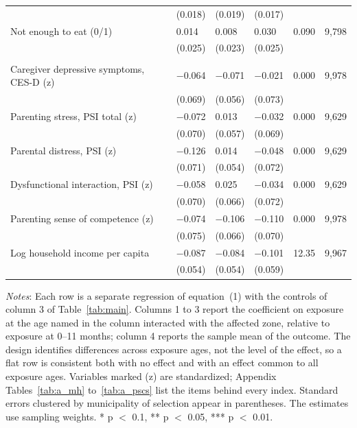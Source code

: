 \begin{table}[htbp]
\begin{minipage}{460pt}
{\begin{tabular*}{460pt}{@{}p{200pt}@{\extracolsep{\fill}}lllll@{}}
 & (0.018) & (0.019) & (0.017) & & \\
Not enough to eat (0/1) & 0.014 & 0.008 & 0.030 & 0.090 & 9,798 \\
 & (0.025) & (0.023) & (0.025) & & \\
\addlinespace[5pt]
\multicolumn{6}{@{}l}{\textbf{\textit{Panel C: Caregiver and household}}} \\
Caregiver depressive symptoms, CES-D (z) & $-$0.064 & $-$0.071 & $-$0.021 & 0.000 & 9,978 \\
 & (0.069) & (0.056) & (0.073) & & \\
Parenting stress, PSI total (z) & $-$0.072 & 0.013 & $-$0.032 & 0.000 & 9,629 \\
 & (0.070) & (0.057) & (0.069) & & \\
Parental distress, PSI (z) & $-$0.126\sym{*} & 0.014 & $-$0.048 & 0.000 & 9,629 \\
 & (0.071) & (0.054) & (0.072) & & \\
Dysfunctional interaction, PSI (z) & $-$0.058 & 0.025 & $-$0.034 & 0.000 & 9,629 \\
 & (0.070) & (0.066) & (0.072) & & \\
Parenting sense of competence (z) & $-$0.074 & $-$0.106 & $-$0.110 & 0.000 & 9,978 \\
 & (0.075) & (0.066) & (0.070) & & \\
Log household income per capita & $-$0.087 & $-$0.084 & $-$0.101\sym{*} & 12.35 & 9,967 \\
 & (0.054) & (0.054) & (0.059) & & \\
\bottomrule
\end{tabular*}\par}
\vspace{4pt}
{\footnotesize
\textit{Notes}: Each row is a separate regression of equation~(1) with the controls of column 3 of Table~\ref{tab:main}. Columns 1 to 3 report the coefficient on exposure at the age named in the column interacted with the affected zone, relative to exposure at 0--11 months; column 4 reports the sample mean of the outcome. The design identifies differences across exposure ages, not the level of the effect, so a flat row is consistent both with no effect and with an effect common to all exposure ages. Variables marked (z) are standardized; Appendix Tables~\ref{tab:a_mh} to~\ref{tab:a_pscs} list the items behind every index. Standard errors clustered by municipality of selection appear in parentheses. The estimates use sampling weights. * p $<$ 0.1, ** p $<$ 0.05, *** p $<$ 0.01.
\par}
\end{minipage}
\end{table}

